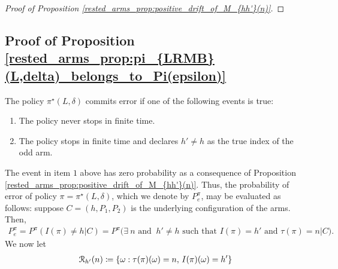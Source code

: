 \begin{proof}[Proof of Proposition \ref{rested_arms_prop:positive_drift_of_M_{hh'}(n)}]
\end{proof}

\subsection{Proof of Proposition \ref{rested_arms_prop:pi_{LRMB}(L,delta)_belongs_to_Pi(epsilon)}}\label{rested_arms_appndx:pi_{LRMB}(L,delta)_belongs_to_Pi(epsilon)}
 The policy $\pi^{\star}(L,\delta)$ commits error if one of the following events is true:
\begin{enumerate}
	\item The policy never stops in finite time.
	\item The policy stops in finite time and declares $h'\neq h$ as the true index of the odd arm.
\end{enumerate}
The event in item $1$ above has zero probability as a consequence of Proposition \ref{rested_arms_prop:positive_drift_of_M_{hh'}(n)}.
Thus, the probability of error of policy $\pi=\pi^{\star}(L,\delta)$, which we denote by $P^\pi_e$, may be evaluated as follows: suppose $C=(h,P_1,P_2)$ is the underlying configuration of the arms. Then,
\begingroup\allowdisplaybreaks\begin{align}
	P^\pi_e =P^\pi(I(\pi)\neq h|C)
	=P^\pi\bigg(\exists~ n\text{ and }~h'\neq h\text{ such that }
	I(\pi)=h'\text{ and } \tau(\pi)=n\bigg\vert C\bigg).\label{rested_arms_eq:P_e_partial_1}
\end{align}\endgroup
We now let
\begingroup\allowdisplaybreaks\begin{align}
	\mathcal{R}_{h'}(n)\coloneqq\{\omega:\tau(\pi)(\omega)=n,\,I(\pi)(\omega)=h'\}\label{rested_arms_eq:R_{h'}(n)}
\end{align}\endgroup
